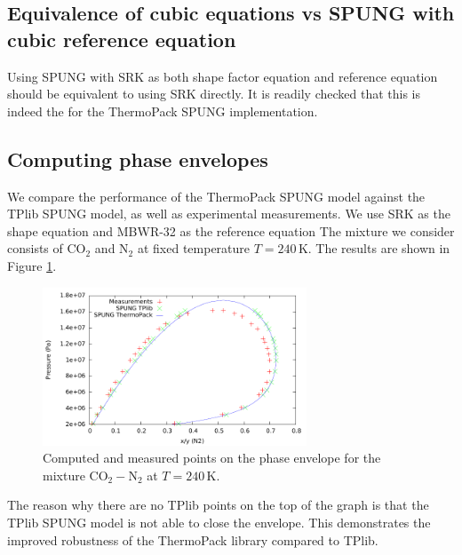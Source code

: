 \documentclass[english]{../thermomemo/thermomemo}
\numberwithin{equation}{section}
\begin{document}
\subsection{Equivalence of cubic equations vs SPUNG with cubic reference
  equation}
Using SPUNG with SRK as both shape factor equation and reference
equation should be equivalent to using SRK directly. It is readily
checked that this is indeed the for the ThermoPack SPUNG implementation.

\subsection{Computing phase envelopes}
We compare the performance of the ThermoPack SPUNG model against
the TPlib SPUNG model, as well as experimental measurements. We use
SRK as the shape equation and MBWR-32 as the reference equation The
mixture we consider consists of $\mathrm{CO}_2$ and $\mathrm N_2$ at
fixed temperature $T=240 \, \mathrm{K}$. The results are shown in
Figure \ref{fig:phaseEnv}.

\begin{figure}[h]
  \centering
  \includegraphics[width=0.7\textwidth]{figures/phaseEnvelope_regular.pdf}
  \caption{Computed and measured points on the phase envelope for the mixture
    $\mathrm{CO}_2-\mathrm N_2$ at $T=240 \, \mathrm{K}$.}
  \label{fig:phaseEnv}
\end{figure}

The reason why there are no TPlib points on the top of the graph is
that the TPlib SPUNG model is not able to close the envelope. This
demonstrates the improved robustness of the ThermoPack library
compared to TPlib.
\end{document}
